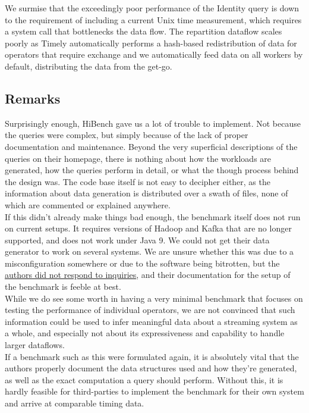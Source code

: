 We surmise that the exceedingly poor performance of the Identity query is down to the requirement of including a current Unix time measurement, which requires a system call that bottlenecks the data flow. The repartition dataflow scales poorly as Timely automatically performs a hash-based redistribution of data for operators that require exchange and we automatically feed data on all workers by default, distributing the data from the get-go.

\subsection{Remarks}\label{section:hibench-remarks}
Surprisingly enough, HiBench gave us a lot of trouble to implement. Not because the queries were complex, but simply because of the lack of proper documentation and maintenance. Beyond the very superficial descriptions of the queries on their homepage, there is nothing about how the workloads are generated, how the queries perform in detail, or what the though process behind the design was. The code base itself is not easy to decipher either, as the information about data generation is distributed over a swath of files, none of which are commented or explained anywhere. \\

If this didn't already make things bad enough, the benchmark itself does not run on current setups. It requires versions of Hadoop and Kafka that are no longer supported, and does not work under Java 9. We could not get their data generator to work on several systems. We are unsure whether this was due to a misconfiguration somewhere or due to the software being bitrotten, but the \href{https://github.com/intel-hadoop/HiBench/issues/535}{authors did not respond to inquiries}, and their documentation for the setup of the benchmark is feeble at best. \\

While we do see some worth in having a very minimal benchmark that focuses on testing the performance of individual operators, we are not convinced that such information could be used to infer meaningful data about a streaming system as a whole, and especially not about its expressiveness and capability to handle larger dataflows. \\

If a benchmark such as this were formulated again, it is absolutely vital that the authors properly document the data structures used and how they're generated, as well as the exact computation a query should perform. Without this, it is hardly feasible for third-parties to implement the benchmark for their own system and arrive at comparable timing data.

